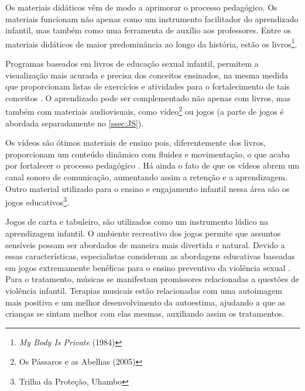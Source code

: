 



Os materiais didáticos vêm de modo a aprimorar o processo pedagógico. Os materiais funcionam não apenas como um instrumento facilitador do aprendizado infantil, mas também como uma ferramenta de auxílio aos professores. Entre os materiais didáticos de maior predominância ao longo da história, estão os livros\footnote{\textit{My Body Is Private} (1984)}.

Programas baseados em livros de educação sexual infantil, permitem a visualização mais acurada e precisa dos conceitos ensinados, na mesma medida que proporcionam listas de exercícios e atividades para o fortalecimento de tais conceitos \cite{maria2010papel}. O aprendizado pode ser complementado não apenas com livros, mas também com materiais audiovisuais, como vídeo\footnote{Os Pássaros e as Abelhas (2005)} ou jogos (a parte de jogos é abordada separadamente no \autoref{ssec:JS}). 

 

Os vídeos são ótimos materiais de ensino pois, diferentemente dos livros, proporcionam um conteúdo dinâmico com fluidez e movimentação, o que acaba por fortalecer o processo pedagógico \cite{maria2010papel}. Há ainda o fato de que os vídeos abrem um canal sonoro de comunicação, aumentando assim a retenção e a aprendizagem. Outro material utilizado para o ensino e engajamento infantil nessa área são os jogos educativos\footnote{Trilha da Proteção, Uhambo}. 

Jogos de carta e tabuleiro, %
são utilizados como um instrumento lúdico na aprendizagem infantil. O ambiente recreativo dos jogos permite que assuntos sensíveis possam ser abordados de maneira mais divertida e natural. Devido a essas características, especialistas consideram as abordagens educativas baseadas em jogos extremamente benéficas para o ensino preventivo da violência sexual \cite{meyer2017analise}. Para o tratamento, músicas se manifestam promissores relacionadas a questões de violência infantil. Terapias musicais estão relacionadas com uma autoimagem mais positiva e um melhor desenvolvimento da autoestima, ajudando a que as crianças se sintam melhor com elas mesmas, auxiliando assim os tratamentos. 


